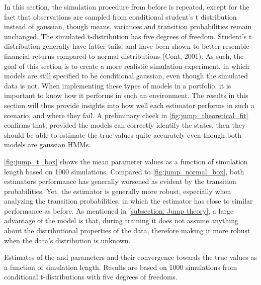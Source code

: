 In this section, the simulation procedure from before is repeated, except for the fact that observations are sampled from conditional student's t distribution instead of gaussian, though means, variances and transition probabilities remain unchanged. The simulated t-distribution has five degrees of freedom. Student's t distribution generally have fatter tails, and have been shown to better resemble financial returns compared to normal distributions (Cont, 2001). As such, the goal of this section is to create a more realistic simulation experiment, in which models are still specified to be conditional gaussian, even though the simulated data is not. When implementing these types of models in a portfolio, it is important to know how it performs in such an environment. The results in this section will thus provide insights into how well each estimator performs in such a scenario, and where they fail. A preliminary check in \cref{fig:jump_theoretical_fit} confirms that, provided the models can correctly identify the states, then they should be able to estimate the true values quite accurately even though both models are gaussian HMMs.

\cref{fig:jump_t_box} shows the mean parameter values as a function of simulation length based on 1000 simulations. Compared to \cref{fig:jump_normal_box}, both estimators performance has generally worsened as evident by the transition probabilities. Yet, the \jump estimator is generally more robust, especially when analyzing the transition probabilities, in which the \jump estimator has close to similar performance as before. As mentioned in \cref{subsection: Jump theory}, a large advantage of the \jump model is that, during training it does not assume anything about the distributional properties of the data, therefore making it more robust when the data's distribution is unknown.

\begin{table}[H]
\centering

\caption[Estimates from conditional t-distributions of the \mle and \jump parameters and their convergence towards the true values]{Estimates of the \mle and \jump parameters and their convergence towards the true values as a function of simulation length. Results are based on 1000 simulations from conditional t-distributions with five degrees of freedoms.}

\label{tab:sim_misspec_t}
\end{table}

